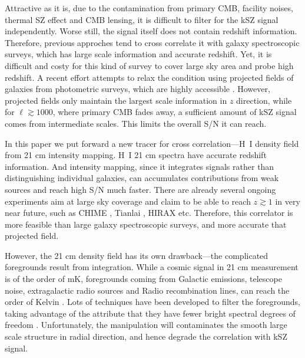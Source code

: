 Attractive as it is, 
due to the contamination from primary CMB, facility noises, 
thermal SZ effect and CMB lensing, 
it is difficult to filter for the kSZ signal independently. 
Worse still, the signal itself does not contain redshift information.
Therefore, previous approches tend to cross correlate it with 
galaxy spectroscopic surveys, 
which has large scale information and accurate redshift. 
Yet, it is difficult and costy for this kind of survey to cover large sky area 
and probe high redshift.  
A recent effort attempts to relax the condition using projected fields of galaxies 
from photometric surveys, which are highly accessible \cite{Hill16,Ferraro16}. 
However, projected fields only maintain the largest scale information in $z$ direction, 
while for $\ell\gtrsim1000$, where primary CMB fades away, a sufficient amount of kSZ signal comes from intermediate scales. 
This limits the overall S/N it can reach.

In this paper we put forward a new tracer for cross correlation---H~I density field from 21 cm intensity mapping. 
H~I 21 cm spectra have accurate redshift information. 
And intensity mapping, since it 
integrates signals 
rather than distinguishing individual galaxies, 
can accumulates contributions from weak sources 
and reach high S/N much faster. 
There are already several ongoing experiments aim at large sky coverage and claim to be able to reach $z\gtrsim1$ in very near future, such as
CHIME \cite{2014SPIE.9145E..22B}, Tianlai \cite{2015ApJ...798...40X}, 
HIRAX \cite{HIRAX} etc.
Therefore, this correlator is more feasible than large galaxy spectroscopic surveys, 
and more accurate that projected field.

However, the 21 cm density field has its own drawback---the complicated foregrounds result from integration. 
While a cosmic signal in 21 cm measurement is of the order of mK,  
foregrounds coming from Galactic emissions, telescope noise, 
extragalactic radio sources and Radio recombination lines, 
can reach the order of Kelvin \cite{DiMatteo04,Masui13}. 
Lots of techniques have been developed to filter the foregrounds, 
taking advantage of the attribute that they have fewer bright spectral
degrees of freedom \cite{Switzer15}.
Unfortunately, the manipulation will contaminates the smooth large scale structure in radial direction, 
and hence degrade the correlation with kSZ signal.

